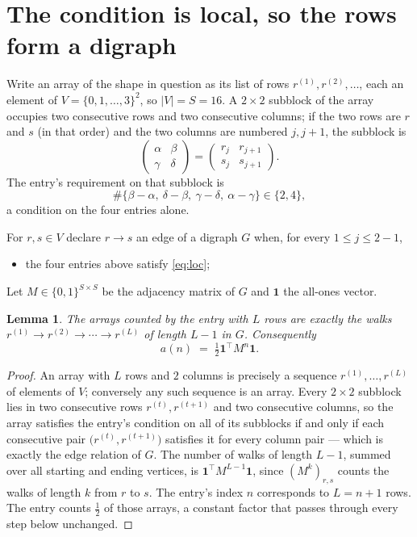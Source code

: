 \documentclass[11pt,a4paper]{article}
\theoremstyle{plain}
\newtheorem{lemma}[theorem]{Lemma}
\theoremstyle{definition}
\begin{document}
\section{The condition is local, so the rows form a digraph}

Write an array of the shape in question as its list of rows
$r^{(1)},r^{(2)},\dots$, each an element of
$V=\{0,1,\dots,3\}^{2}$, so $|V|=S=16$. A $2\times2$ subblock of the array
occupies two consecutive rows and two consecutive columns; if the two rows are $r$
and $s$ (in that order) and the two columns are numbered $j,j+1$,
the subblock is
\[
\begin{pmatrix}\alpha&\beta\\\gamma&\delta\end{pmatrix}=\begin{pmatrix}r_j&r_{j+1}\\s_j&s_{j+1}\end{pmatrix}.
\]
The entry's requirement on that subblock is
\begin{equation}\label{eq:loc}
\#\{\beta-\alpha,\ \delta-\beta,\ \gamma-\delta,\ \alpha-\gamma\}\in\{2,4\},
\end{equation}
a condition on the four entries alone.

For $r,s\in V$ declare $r\to s$ an edge of a digraph $G$ when, for every
$1\le j\le 2-1$,
\begin{itemize}
\item the four entries above satisfy \eqref{eq:loc};

\end{itemize}
Let $M\in\{0,1\}^{S\times S}$ be the adjacency matrix of $G$ and $\mathbf{1}$ the
all-ones vector.

\begin{lemma}\label{lem:walk}
The arrays counted by the entry with $L$ rows are exactly the walks
$r^{(1)}\to r^{(2)}\to\cdots\to r^{(L)}$ of length $L-1$ in $G$. Consequently
\[
a(n)\;=\;\tfrac1{2}\mathbf{1}^{\!\top}M^{n}\mathbf{1} .
\]
\end{lemma}

\begin{proof}
An array with $L$ rows and $2$ columns is precisely a sequence
$r^{(1)},\dots,r^{(L)}$ of elements of $V$; conversely any such sequence is an array.
Every $2\times2$ subblock lies in two consecutive rows $r^{(t)},r^{(t+1)}$ and two
consecutive columns, so the array satisfies the entry's condition on all of its subblocks
if and only if each consecutive pair $\bigl(r^{(t)},r^{(t+1)}\bigr)$ satisfies it for
every column pair --- which is exactly the edge relation of $G$. The number of walks of
length $L-1$, summed over all starting and ending vertices, is
$\mathbf{1}^{\!\top}M^{L-1}\mathbf{1}$, since $(M^{k})_{r,s}$ counts the walks of
length $k$ from $r$ to $s$. The entry's index $n$ corresponds to $L=n+1$ rows. The entry counts $\tfrac1{2}$ of those arrays, a constant factor that passes through every step below unchanged.
\end{proof}
\end{document}
